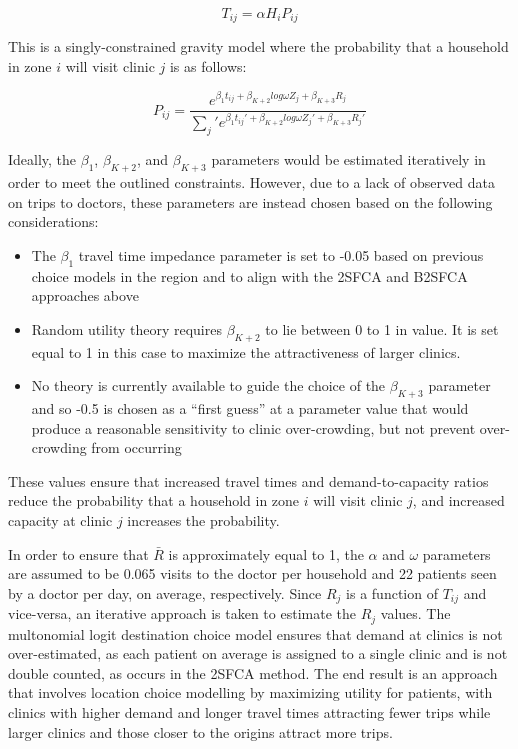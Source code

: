 \documentclass{article}
\begin{document}
\[
T_{ij} = \alpha H_i P_{ij}
\]

This is a singly-constrained gravity model where the probability that a
household in zone \(i\) will visit clinic \(j\) is as follows:

\[
P_{ij} = \frac{e^{\beta_1 t_{ij} + \beta_{K+2} log \omega Z_j + \beta_{K + 3} R_j}}{\sum_j\prime e^{\beta_1 t_{ij}\prime + \beta_{K+2} log \omega Z_j\prime + \beta_{K + 3} R_j\prime}}
\]

Ideally, the \(\beta_1\), \(\beta_{K+2}\), and \(\beta_{K + 3}\)
parameters would be estimated iteratively in order to meet the outlined
constraints. However, due to a lack of observed data on trips to
doctors, these parameters are instead chosen based on the following
considerations:

\begin{itemize}
\item
  The \(\beta_1\) travel time impedance parameter is set to -0.05 based
  on previous choice models in the region and to align with the 2SFCA
  and B2SFCA approaches above
\item
  Random utility theory requires \(\beta_{K+2}\) to lie between 0 to 1
  in value. It is set equal to 1 in this case to maximize the
  attractiveness of larger clinics.
\item
  No theory is currently available to guide the choice of the
  \(\beta_{K+3}\) parameter and so -0.5 is chosen as a ``first guess''
  at a parameter value that would produce a reasonable sensitivity to
  clinic over-crowding, but not prevent over-crowding from occurring
\end{itemize}

These values ensure that increased travel times and demand-to-capacity
ratios reduce the probability that a household in zone \(i\) will visit
clinic \(j\), and increased capacity at clinic \(j\) increases the
probability.

In order to ensure that \(\bar{R}\) is approximately equal to 1, the
\(\alpha\) and \(\omega\) parameters are assumed to be 0.065 visits to
the doctor per household and 22 patients seen by a doctor per day, on
average, respectively. Since \(R_j\) is a function of \(T_{ij}\) and
vice-versa, an iterative approach is taken to estimate the \(R_j\)
values. The multonomial logit destination choice model ensures that
demand at clinics is not over-estimated, as each patient on average is
assigned to a single clinic and is not double counted, as occurs in the
2SFCA method. The end result is an approach that involves location
choice modelling by maximizing utility for patients, with clinics with
higher demand and longer travel times attracting fewer trips while
larger clinics and those closer to the origins attract more trips.
\end{document}
